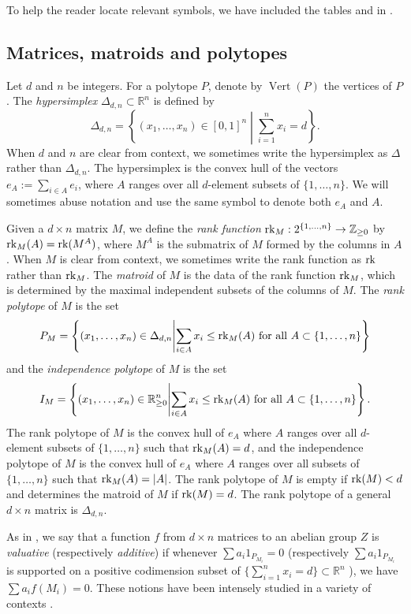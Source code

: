 \documentclass[12pt]{amsart}
\newcommand{\mb}{\mathbb}
\newcommand{\rk}{{\rm rk}}
\newcommand{\Vt}{{\operatorname{Vert}}}
\theoremstyle{plain}
\theoremstyle{definition}
\theoremstyle{remark}
\begin{document}
To help the reader locate relevant symbols, we have included the tables  and  in .

\subsection{Matrices, matroids and polytopes}
\label{matroidpolytopedef}
Let $d$ and $n$ be integers. For a polytope $P$, denote by $\Vt(P)$ the vertices of $P$. The \emph{hypersimplex} $\Delta_{d,n} \subset \mb{R}^n$ is defined by $$\Delta_{d,n}=\left\{(x_1, \ldots, x_n) \in [0, 1]^n\middle|\sum_{i=1}^n x_i = d\right\}.$$ When $d$ and $n$ are clear from context, we sometimes write the hypersimplex as $\Delta$ rather than $\Delta_{d, n}$. The hypersimplex is the convex hull of the vectors $e_A := \sum_{i \in A} e_i$, where $A$ ranges over all $d$-element subsets of $\{1, \ldots, n\}$. We will sometimes abuse notation and use the same symbol to denote both $e_A$ and $A$. 

Given a $d \times n$ matrix $M$, we define the \emph{rank function} $\rk_M:2^{\{1,\ldots,n\}} \to \mb{Z}_{\ge 0}$ by $\rk_M(A)=\rk(M^A)$, where $M^A$ is the submatrix of $M$ formed by the columns in $A$. When $M$ is clear from context, we sometimes write the rank function as $\rk$ rather than $\rk_M$. The \emph{matroid} of $M$ is the data of the rank function $\rk_M$, which is determined by the maximal independent subsets of the columns of $M$. The \emph{rank polytope} of $M$ is the set
\[P_M=\left\{(x_1, \ldots, x_n) \in \Delta_{d,n}\middle|\text{$\sum_{i \in A} x_i \leq \rk_M(A)$ for all $A \subset \{1, \ldots, n\}$}\right\}\] and the \emph{independence polytope} of $M$ is the set
\[I_M=\left\{(x_1, \ldots, x_n) \in \mb{R}_{\geq 0}^n\middle|\text{$\sum_{i \in A} x_i \leq \rk_M(A)$ for all $A \subset \{1, \ldots, n\}$}\right\}.\]
 The rank polytope of $M$ is the convex hull of $e_A$ where $A$ ranges over all $d$-element subsets of $\{1, \ldots, n\}$ such that $\rk_M(A) = d$, and the independence polytope of $M$ is the convex hull of $e_A$ where $A$ ranges over all subsets of $\{1, \ldots, n\}$ such that $\rk_M(A) = |A|$.
The rank polytope of $M$ is empty if $\rk(M) < d$ and determines the matroid of $M$ if $\rk(M)=d$. The rank polytope of a general $d \times n$ matrix is $\Delta_{d, n}$. 

As in \cite{Derksen}, we say that a function $f$ from $d \times n$ matrices to an abelian group $Z$ is \emph{valuative} (respectively \emph{additive}) if whenever $\sum a_i1_{P_{M_i}}=0$ (respectively $\sum a_i 1_{P_{M_i}}$ is supported on a positive codimension subset of $\{\sum_{i=1}^n x_i=d\} \subset \mb{R}^n$ ), we have $\sum a_i f(M_i)=0$. These notions have been intensely studied in a variety of contexts \cite{Harm,Derksen,SpeInvariant}.
\end{document}

